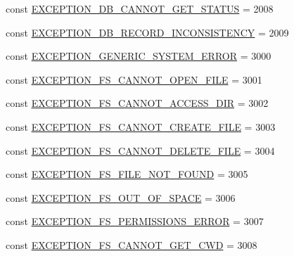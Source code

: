 \begin{DoxyCompactItemize}
\item 
const \hyperlink{class_database_exception_model_a078837d5b35b669c158aa3cc2c0e2a9f}{E\+X\+C\+E\+P\+T\+I\+O\+N\+\_\+\+D\+B\+\_\+\+C\+A\+N\+N\+O\+T\+\_\+\+G\+E\+T\+\_\+\+S\+T\+A\+T\+U\+S} = 2008
\item 
const \hyperlink{class_database_exception_model_aa49625b4d6d958dd9dff0969725eec8b}{E\+X\+C\+E\+P\+T\+I\+O\+N\+\_\+\+D\+B\+\_\+\+R\+E\+C\+O\+R\+D\+\_\+\+I\+N\+C\+O\+N\+S\+I\+S\+T\+E\+N\+C\+Y} = 2009
\item 
const \hyperlink{class_database_exception_model_ac2b0baa16c6c435065699e0606272706}{E\+X\+C\+E\+P\+T\+I\+O\+N\+\_\+\+G\+E\+N\+E\+R\+I\+C\+\_\+\+S\+Y\+S\+T\+E\+M\+\_\+\+E\+R\+R\+O\+R} = 3000
\item 
const \hyperlink{class_database_exception_model_a460f308cd80a87c48d51ac54e61b37bc}{E\+X\+C\+E\+P\+T\+I\+O\+N\+\_\+\+F\+S\+\_\+\+C\+A\+N\+N\+O\+T\+\_\+\+O\+P\+E\+N\+\_\+\+F\+I\+L\+E} = 3001
\item 
const \hyperlink{class_database_exception_model_a4cde73367b61f571c353362002618265}{E\+X\+C\+E\+P\+T\+I\+O\+N\+\_\+\+F\+S\+\_\+\+C\+A\+N\+N\+O\+T\+\_\+\+A\+C\+C\+E\+S\+S\+\_\+\+D\+I\+R} = 3002
\item 
const \hyperlink{class_database_exception_model_ada70b9523f11c2115e75b0c1298b7b95}{E\+X\+C\+E\+P\+T\+I\+O\+N\+\_\+\+F\+S\+\_\+\+C\+A\+N\+N\+O\+T\+\_\+\+C\+R\+E\+A\+T\+E\+\_\+\+F\+I\+L\+E} = 3003
\item 
const \hyperlink{class_database_exception_model_ab8908292d329eb19e5e2a01e65efec4a}{E\+X\+C\+E\+P\+T\+I\+O\+N\+\_\+\+F\+S\+\_\+\+C\+A\+N\+N\+O\+T\+\_\+\+D\+E\+L\+E\+T\+E\+\_\+\+F\+I\+L\+E} = 3004
\item 
const \hyperlink{class_database_exception_model_aba74a043f93aff28bf7d913d64504889}{E\+X\+C\+E\+P\+T\+I\+O\+N\+\_\+\+F\+S\+\_\+\+F\+I\+L\+E\+\_\+\+N\+O\+T\+\_\+\+F\+O\+U\+N\+D} = 3005
\item 
const \hyperlink{class_database_exception_model_a1d7160b183812594679877046c3fd62a}{E\+X\+C\+E\+P\+T\+I\+O\+N\+\_\+\+F\+S\+\_\+\+O\+U\+T\+\_\+\+O\+F\+\_\+\+S\+P\+A\+C\+E} = 3006
\item 
const \hyperlink{class_database_exception_model_aa1ed10447564eb986514790822a1516c}{E\+X\+C\+E\+P\+T\+I\+O\+N\+\_\+\+F\+S\+\_\+\+P\+E\+R\+M\+I\+S\+S\+I\+O\+N\+S\+\_\+\+E\+R\+R\+O\+R} = 3007
\item 
const \hyperlink{class_database_exception_model_a40d50055804a9019ed22faec53b5f7ca}{E\+X\+C\+E\+P\+T\+I\+O\+N\+\_\+\+F\+S\+\_\+\+C\+A\+N\+N\+O\+T\+\_\+\+G\+E\+T\+\_\+\+C\+W\+D} = 3008
\item 

\end{DoxyCompactItemize}
